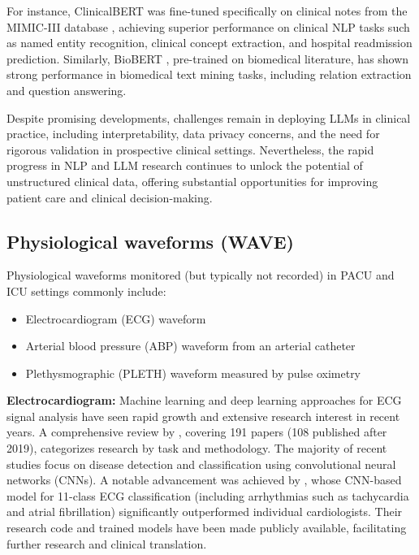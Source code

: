 For instance, ClinicalBERT \citep{alsentzer2019publicly} was fine-tuned specifically on clinical notes from the MIMIC-III database \citep{johnson2016mimic}, achieving superior performance on clinical NLP tasks such as named entity recognition, clinical concept extraction, and hospital readmission prediction. Similarly, BioBERT \citep{lee2020biobert}, pre-trained on biomedical literature, has shown strong performance in biomedical text mining tasks, including relation extraction and question answering.

Despite promising developments, challenges remain in deploying LLMs in clinical practice, including interpretability, data privacy concerns, and the need for rigorous validation in prospective clinical settings. Nevertheless, the rapid progress in NLP and LLM research continues to unlock the potential of unstructured clinical data, offering substantial opportunities for improving patient care and clinical decision-making.


\subsection{Physiological waveforms (WAVE)}
Physiological waveforms monitored (but typically not recorded) in PACU and ICU settings commonly include:
\begin{itemize}
  \item Electrocardiogram (ECG) waveform
  \item Arterial blood pressure (ABP) waveform from an arterial catheter
  \item Plethysmographic (PLETH) waveform measured by pulse oximetry
\end{itemize}

\vspace{1ex}
\noindent

\textbf{Electrocardiogram:} Machine learning and deep learning approaches for ECG signal analysis have seen rapid growth and extensive research interest in recent years. A comprehensive review by \citet{hong2020opportunities}, covering 191 papers (108 published after 2019), categorizes research by task and methodology. The majority of recent studies focus on disease detection and classification using convolutional neural networks (CNNs). A notable advancement was achieved by \citet{hannun2019cardiologist}, whose CNN-based model for 11-class ECG classification (including arrhythmias such as tachycardia and atrial fibrillation) significantly outperformed individual cardiologists. Their research code and trained models have been made publicly available, facilitating further research and clinical translation.

